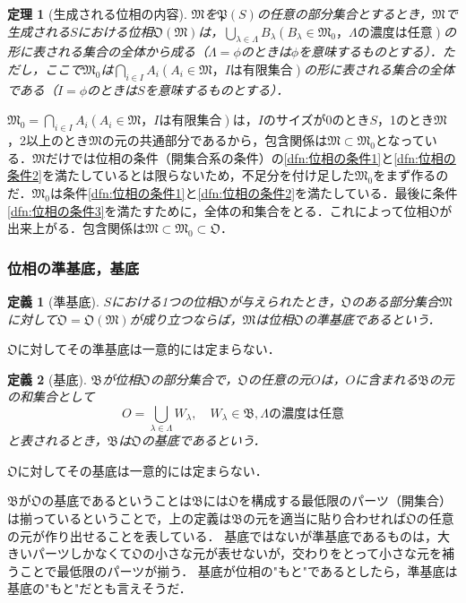 \documentclass[a4paper,10pt,uplatex]{jsarticle}
\numberwithin{equation}{section}
\theoremstyle{mystyle}
\newtheorem{dfn}{定義}[section]
\newtheorem{thm}{定理}[section]
\newcommand{\gB}{\mathfrak{B}}
\newcommand{\gM}{\mathfrak{M}}
\newcommand{\gO}{\mathfrak{O}}
\newcommand{\gP}{\mathfrak{P}}
\begin{document}
\begin{thm}[生成される位相の内容]
    $\gM$を$\gP(S)$の任意の部分集合とするとき，$\gM$で生成される$S$における位相$\gO(\gM)$は，$\bigcup_{\lambda \in \Lambda}B_\lambda (B_\lambda \in \gM_0，\Lambda の濃度は任意)$の形に表される集合の全体から成る（$\Lambda = \phi$のときは$\phi$を意味するものとする）．ただし，ここで$\gM_0$は$\bigcap_{i \in I} A_i (A_i \in \gM，Iは有限集合)$の形に表される集合の全体である（$I = \phi$のときは$S$を意味するものとする）．
\end{thm}

$\gM_0 = \bigcap_{i \in I} A_i (A_i \in \gM，Iは有限集合)$は，$I$のサイズが0のとき$S$，1のとき$\gM$，2以上のとき$\gM$の元の共通部分であるから，包含関係は$\gM \subset \gM_0$となっている．$\gM$だけでは位相の条件（開集合系の条件）の\ref{dfn:位相の条件1}と\ref{dfn:位相の条件2}を満たしているとは限らないため，不足分を付け足した$\gM_0$をまず作るのだ．$\gM_0$は条件\ref{dfn:位相の条件1}と\ref{dfn:位相の条件2}を満たしている．最後に条件\ref{dfn:位相の条件3}を満たすために，全体の和集合をとる．これによって位相$\gO$が出来上がる．包含関係は$\gM \subset \gM_0 \subset \gO$．

\subsubsection{位相の準基底，基底}
\begin{dfn}[準基底]
    $S$における1つの位相$\gO$が与えられたとき，$\gO$のある部分集合$\gM$に対して$\gO = \gO(\gM)$が成り立つならば，$\gM$は位相$\gO$の準基底であるという．
\end{dfn}
$\gO$に対してその準基底は一意的には定まらない．

\begin{dfn}[基底]
    $\gB$が位相$\gO$の部分集合で，$\gO$の任意の元$O$は，$O$に含まれる$\gB$の元の和集合として
    \begin{equation}
        O = \bigcup_{\lambda \in \Lambda} W_\lambda, \quad W_\lambda \in \gB, \Lambda の濃度は任意
    \end{equation}
    と表されるとき，$\gB$は$\gO$の基底であるという．
\end{dfn}
$\gO$に対してその基底は一意的には定まらない．

$\gB$が$\gO$の基底であるということは$\gB$には$\gO$を構成する最低限のパーツ（開集合）は揃っているということで，上の定義は$\gB$の元を適当に貼り合わせれば$\gO$の任意の元が作り出せることを表している．
基底ではないが準基底であるものは，大きいパーツしかなくて$\gO$の小さな元が表せないが，交わりをとって小さな元を補うことで最低限のパーツが揃う．
基底が位相の"もと"であるとしたら，準基底は基底の"もと"だとも言えそうだ．
\end{document}
